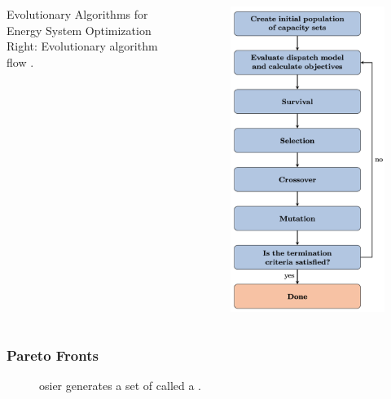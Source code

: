 \begin{frame}
\begin{columns}
\begin{block}{Evolutionary Algorithms for Energy System Optimization}
            Right: Evolutionary algorithm flow \cite{deb_evolutionary_2014}.
        \end{block}
            \column[t]{4cm}
            \centering
            \begin{figure}
            \includegraphics[width=0.75\linewidth]{images/ea-flow.png}  
            \end{figure}
        \end{columns}
\end{frame}


\begin{frame}
    \frametitle{Pareto Fronts}
    \begin{figure}
        \centering
        \resizebox{0.75\columnwidth}{!}{}
        \caption{\gls{osier} generates a set of  called a .}
    \end{figure}
\end{frame}

